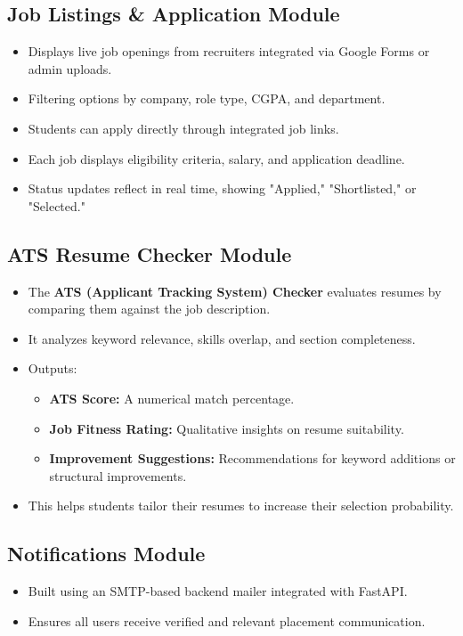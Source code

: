 \documentclass[14pt]{extarticle}
\begin{document}
\subsection{Job Listings \& Application Module}
\begin{itemize}
  \item Displays live job openings from recruiters integrated via Google Forms or admin uploads.
  \item Filtering options by company, role type, CGPA, and department.
  \item Students can apply directly through integrated job links.
  \item Each job displays eligibility criteria, salary, and application deadline.
  \item Status updates reflect in real time, showing "Applied," "Shortlisted," or "Selected."
\end{itemize}

\subsection{ATS Resume Checker Module}
\begin{itemize}
  \item The \textbf{ATS (Applicant Tracking System) Checker} evaluates resumes by comparing them against the job description.
  \item It analyzes keyword relevance, skills overlap, and section completeness.
  \item Outputs:
  \begin{itemize}
    \item \textbf{ATS Score:} A numerical match percentage.
    \item \textbf{Job Fitness Rating:} Qualitative insights on resume suitability.
    \item \textbf{Improvement Suggestions:} Recommendations for keyword additions or structural improvements.
  \end{itemize}
  \item This helps students tailor their resumes to increase their selection probability.
\end{itemize}

\subsection{Notifications Module}
\begin{itemize}
  
  \item Built using an SMTP-based backend mailer integrated with FastAPI.
  \item Ensures all users receive verified and relevant placement communication.
\end{itemize}
\end{document}

